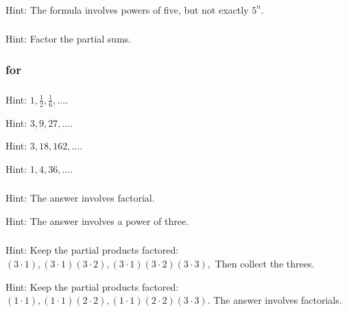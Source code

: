\subsubsection*{ \answers}
Hint: The formula involves powers of five, but not exactly $5^n$.

\subsubsection*{ \answers}
 Hint: Factor the partial sums.

\subsubsection{\answers for  \subprodconj}

\subsubsection*{ \answers}
\begin{apart}
    \item Hint: $\displaystyle 1, \frac{1}{2}, \frac{1}{6}, \ldots$.
    \item Hint: $3, 9, 27, \ldots$.
    \item Hint: $3, 18, 162, \ldots$.
    \item Hint: $1, 4, 36, \ldots$.
\end{apart}

\subsubsection*{ \answers}
\begin{apart}
    \item Hint: The answer involves factorial.
    \item Hint: The answer involves a power of three.
\end{apart}

\subsubsection*{ \answers}
\begin{apart}
    \item Hint: Keep the partial products factored: $(3 \cdot 1), (3 \cdot 1)(3 \cdot 2),(3 \cdot 1)(3 \cdot 2)(3 \cdot 3), $  Then collect the threes.
    \item Hint: Keep the partial products factored: $(1 \cdot 1),(1 \cdot 1)(2 \cdot 2), (1 \cdot 1)(2 \cdot 2)(3 \cdot 3) $. The answer involves factorials.
\end{apart}

